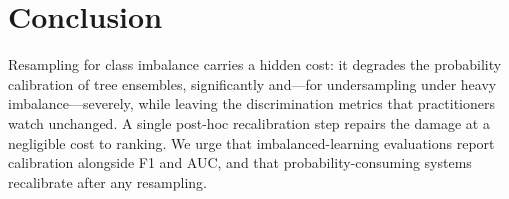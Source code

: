 \documentclass[conference]{IEEEtran}
\begin{document}
\section{Conclusion}
Resampling for class imbalance carries a hidden cost: it degrades the
probability calibration of tree ensembles, significantly and---for
undersampling under heavy imbalance---severely, while leaving the
discrimination metrics that practitioners watch unchanged. A single
post-hoc recalibration step repairs the damage at a negligible cost to
ranking. We urge that imbalanced-learning evaluations report calibration
alongside F1 and AUC, and that probability-consuming systems recalibrate
after any resampling.



\end{document}
